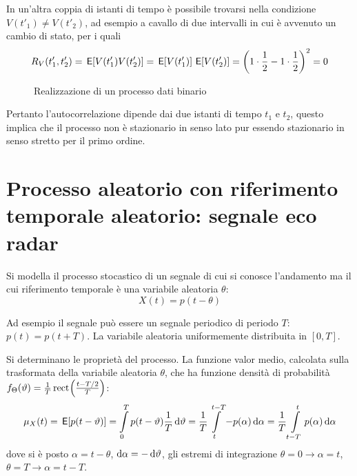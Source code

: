 In un'altra coppia di istanti di tempo è possibile trovarsi nella condizione $V(t'_1)\neq V(t'_2)$, ad esempio a cavallo di due intervalli in cui è avvenuto un cambio di stato, per i quali
\begin{equation}
	R_V(t'_1,t'_2)=\,{\operatorname{\mathsf{E}}}\!\left[{V(t'_1)V(t'_2)}\right]=\,{\operatorname{\mathsf{E}}}\!\left[{V(t'_1)}\right]\,{\operatorname{\mathsf{E}}}\!\left[{V(t'_2)}\right]=\left(1\cdot\frac{1}{2}-1\cdot\frac{1}{2}\right)^2=0
\end{equation}
\begin{figure}[!h]
	\centering
	\caption{Realizzazione di un processo dati binario}
	\label{fig:processo_dati_binario}
\end{figure}

Pertanto l'autocorrelazione dipende dai due istanti di tempo $t_1$ e $t_2$, questo implica che il processo non è stazionario in senso lato pur essendo stazionario in senso stretto per il primo ordine.

\section[Processo aleatorio con riferimento temporale aleatorio]{Processo aleatorio con riferimento temporale aleatorio: segnale eco radar}
Si modella il processo stocastico di un segnale di cui si conosce l'andamento ma il cui riferimento temporale è una variabile aleatoria $\theta$:
\begin{equation}
	X(t)=p(t-\theta)
\end{equation}

Ad esempio il segnale può essere un segnale periodico di periodo $T$: $p(t)=p(t+T)$. La variabile aleatoria uniformemente distribuita in $[0,T]$.

Si determinano le proprietà del processo. La funzione valor medio, calcolata sulla trasformata della variabile aleatoria $\theta$, che ha funzione densità di probabilità $f_\Theta(\vartheta)=\frac{1}{T}\,{\operatorname{rect}}^{}\!\left({\frac{t-T/2}{T}}\right)$:
\[
	\mu_X(t)=\,{\operatorname{\mathsf{E}}}\!\left[{p(t-\vartheta)}\right]=\int\limits_{0}^{T}{p(t-\vartheta)\frac{1}{T}}{\,\mathop{}\!\mathrm{d}{\vartheta}}=\frac{1}{T}\int\limits_{t}^{t-T}{-p(\alpha)}{\,\mathop{}\!\mathrm{d}{\alpha}}=\frac{1}{T}\int\limits_{t-T}^{t}{p(\alpha)}{\,\mathop{}\!\mathrm{d}{\alpha}}
\]
dove si è posto $\alpha=t-\theta$, $\mathop{}\!\mathrm{d}\alpha=-\mathop{}\!\mathrm{d}\vartheta$, gli estremi di integrazione $\theta=0\to\alpha=t$, $\theta=T\to\alpha=t-T$.

